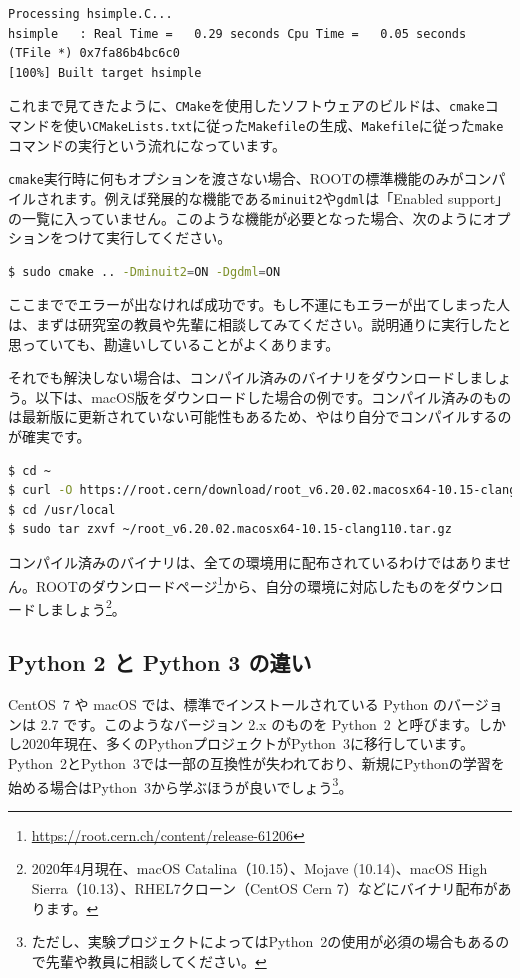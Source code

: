 {\begin{lstlisting}
Processing hsimple.C...
hsimple   : Real Time =   0.29 seconds Cpu Time =   0.05 seconds
(TFile *) 0x7fa86b4bc6c0
[100%] Built target hsimple
\end{lstlisting}

これまで見てきたように、\texttt{CMake}を使用したソフトウェアのビルドは、\texttt{cmake}コマンドを使い\texttt{CMakeLists.txt}に従った\texttt{Makefile}の生成、\texttt{Makefile}に従った\texttt{make}コマンドの実行という流れになっています。

\texttt{cmake}実行時に何もオプションを渡さない場合、ROOTの標準機能のみがコンパイルされます。例えば発展的な機能である\texttt{minuit2}や\texttt{gdml}は「Enabled support」の一覧に入っていません。このような機能が必要となった場合、次のようにオプションをつけて実行してください。

\begin{lstlisting}[language=bash]
$ sudo cmake .. -Dminuit2=ON -Dgdml=ON
\end{lstlisting}

ここまででエラーが出なければ成功です。もし不運にもエラーが出てしまった人は、まずは研究室の教員や先輩に相談してみてください。説明通りに実行したと思っていても、勘違いしていることがよくあります。

それでも解決しない場合は、コンパイル済みのバイナリをダウンロードしましょう。以下は、macOS版をダウンロードした場合の例です。コンパイル済みのものは最新版に更新されていない可能性もあるため、やはり自分でコンパイルするのが確実です。
\begin{lstlisting}[language=bash]
$ cd ~
$ curl -O https://root.cern/download/root_v6.20.02.macosx64-10.15-clang110.tar.gz
$ cd /usr/local
$ sudo tar zxvf ~/root_v6.20.02.macosx64-10.15-clang110.tar.gz
\end{lstlisting}
コンパイル済みのバイナリは、全ての環境用に配布されているわけではありません。ROOTのダウンロードページ\footnote{\url{https://root.cern.ch/content/release-61206}}から、自分の環境に対応したものをダウンロードしましょう\footnote{2020年4月現在、macOS Catalina（10.15）、Mojave (10.14)、macOS High Sierra（10.13）、RHEL7クローン（CentOS Cern 7）などにバイナリ配布があります。}。

\subsection{Python 2 と Python 3 の違い}
\label{subsec:python23}

CentOS~7 や macOS では、標準でインストールされている Python のバージョンは 2.7 です。このようなバージョン 2.x のものを Python~2 と呼びます。しかし2020年現在、多くのPythonプロジェクトがPython~3に移行しています。Python~2とPython~3では一部の互換性が失われており、新規にPythonの学習を始める場合はPython~3から学ぶほうが良いでしょう\footnote{ただし、実験プロジェクトによってはPython~2の使用が必須の場合もあるので先輩や教員に相談してください。}。

}
